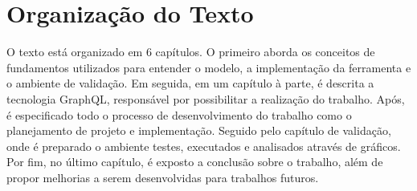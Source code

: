 \section[Organização do Texto]{Organização do Texto}

O texto está organizado em 6 capítulos. O primeiro aborda os conceitos de fundamentos utilizados para entender o modelo, a implementação da ferramenta e o ambiente de validação. Em seguida, em um capítulo à parte, é descrita a tecnologia GraphQL, responsável por possibilitar a realização do trabalho. Após, é especificado todo o processo de desenvolvimento do trabalho como o planejamento de projeto e implementação. Seguido pelo capítulo de validação, onde é preparado o ambiente testes, executados e analisados através de gráficos. Por fim, no último capítulo, é exposto a conclusão sobre o trabalho, além de propor melhorias a serem desenvolvidas para trabalhos futuros.

